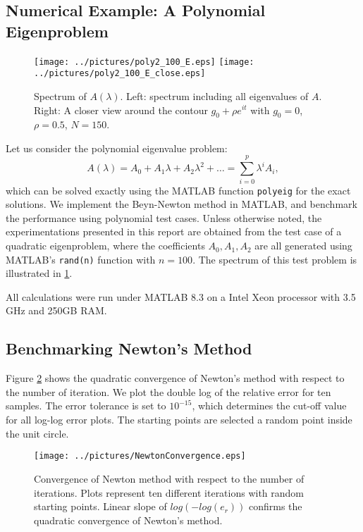 \documentclass[11pt,letterpaper]{article}
\begin{document}
\subsection{Numerical Example: A Polynomial Eigenproblem}
\begin{figure}
\label{fig:E}
\begin{center}
\texttt{[image: ../pictures/poly2\_100\_E.eps]}
\texttt{[image: ../pictures/poly2\_100\_E\_close.eps]}
\end{center}
\caption{Spectrum of $A(\lambda)$. \textnormal{Left: spectrum including all eigenvalues of $A$. Right: A closer view around the contour $g_0+\rho e^{it}$ with $g_0=0$, $\rho=0.5$, $N=150$.}}
\end{figure}

Let us consider the polynomial eigenvalue problem:
\begin{equation}
\label{eq:polyeig}
A(\lambda)= A_0+A_1 \lambda + A_2 \lambda^2 + \ldots =\sum\limits_{i=0}^{p}\lambda^iA_i ,
\end{equation}
which can be solved exactly using the MATLAB function {\tt polyeig} for the exact solutions. We implement the Beyn-Newton method in MATLAB, and benchmark the performance using polynomial test cases. Unless otherwise noted, the experimentations presented in this report are obtained from the test case of a quadratic eigenproblem, where the coefficients $A_0, A_1, A_2$ are all generated using MATLAB's {\tt rand(n)} function with $n=100$. The spectrum of this test problem is illustrated in \ref{fig:E}. 

All calculations were run under MATLAB 8.3 on a Intel Xeon processor with 3.5 GHz and 250GB RAM. 
\subsection{Benchmarking Newton's Method}
Figure \ref{fig:NewtonBenchmark} shows the quadratic convergence of Newton's method with respect to the number of iteration. We plot the double log of the relative error for ten samples. The error tolerance is set to $10^{-15}$, which determines the cut-off value for all log-log error plots. The starting points are selected a random point inside the unit circle. 
\begin{figure}\label{fig:NewtonBenchmark}
\begin{center}
\texttt{[image: ../pictures/NewtonConvergence.eps]}
\end{center}
\caption{Convergence of Newton method with respect to the number of iterations. \textnormal{Plots represent ten different iterations with random starting points. Linear slope of $log(-log(e_r))$ confirms the quadratic convergence of Newton's method.}}
\end{figure}
\end{document}
